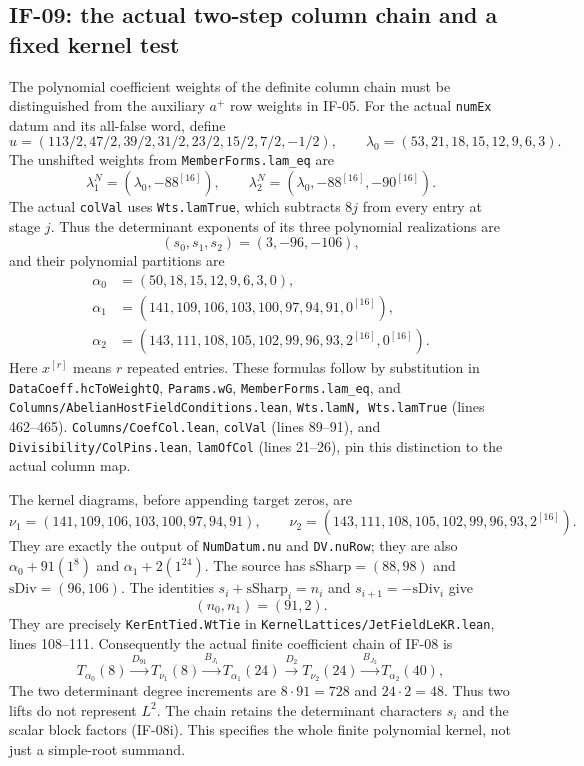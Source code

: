 \subsection{IF-09: the actual two-step column chain and a fixed kernel test}
The polynomial coefficient weights of the definite column chain must
be distinguished from the auxiliary $a^+$ row weights in IF-05.
For the actual \texttt{numEx} datum and its all-false word, define
\[
 u=(113/2,47/2,39/2,31/2,23/2,15/2,7/2,-1/2),\qquad
 \lambda_0=(53,21,18,15,12,9,6,3).
\]
The unshifted weights from \texttt{MemberForms.lam\_eq} are
\[
 \lambda_1^N=(\lambda_0,-88^{[16]}),\qquad
 \lambda_2^N=(\lambda_0,-88^{[16]},-90^{[16]}).
\]
The actual \texttt{colVal} uses \texttt{Wts.lamTrue}, which subtracts
$8j$ from every entry at stage $j$. Thus the determinant exponents of
its three polynomial realizations are
\[
 (s_0,s_1,s_2)=(3,-96,-106),
\]
and their polynomial partitions are
\[
\begin{split}
 \alpha_0&=(50,18,15,12,9,6,3,0),\\
 \alpha_1&=(141,109,106,103,100,97,94,91,0^{[16]}),\\
 \alpha_2&=(143,111,108,105,102,99,96,93,2^{[16]},0^{[16]}).
\end{split}                                                     \tag{IF-09a}
\]
Here $x^{[r]}$ means $r$ repeated entries. These formulas follow by
substitution in \texttt{DataCoeff.hcToWeightQ},
\texttt{Params.wG}, \texttt{MemberForms.lam\_eq}, and
\texttt{Columns/AbelianHostFieldConditions.lean},
\texttt{Wts.lamN, Wts.lamTrue} (lines 462--465).
\texttt{Columns/CoefCol.lean}, \texttt{colVal} (lines 89--91), and
\texttt{Divisibility/ColPins.lean}, \texttt{lamOfCol} (lines 21--26),
pin this distinction to the actual column map.

The kernel diagrams, before appending target zeros, are
\[
 \nu_1=(141,109,106,103,100,97,94,91),\qquad
 \nu_2=(143,111,108,105,102,99,96,93,2^{[16]}).       \tag{IF-09b}
\]
They are exactly the output of \texttt{NumDatum.nu} and
\texttt{DV.nuRow}; they are also
$\alpha_0+91(1^8)$ and $\alpha_1+2(1^{24})$.
The source has
$\mathrm{sSharp}=(88,98)$ and $\mathrm{sDiv}=(96,106)$.
The identities
$s_i+\mathrm{sSharp}_i=n_i$ and
$s_{i+1}=-\mathrm{sDiv}_i$ give
\[
 (n_0,n_1)=(91,2).                                  \tag{IF-09c}
\]
They are precisely \texttt{KerEntTied.WtTie} in
\texttt{KernelLattices/JetFieldLeKR.lean}, lines 108--111.
Consequently the actual finite coefficient chain of IF-08 is
\[
 T_{\alpha_0}(8)\xrightarrow{D_{91}}
 T_{\nu_1}(8)\xrightarrow{B_{J_1}}
 T_{\alpha_1}(24)\xrightarrow{D_2}
 T_{\nu_2}(24)\xrightarrow{B_{J_2}}
 T_{\alpha_2}(40),                                  \tag{IF-09d}
\]
The two determinant degree increments are $8\cdot91=728$ and
$24\cdot2=48$. Thus two lifts do not represent $L^2$.
The chain retains the determinant characters $s_i$ and the scalar block
factors (IF-08i). This specifies the whole finite polynomial kernel,
not just a simple-root summand.

